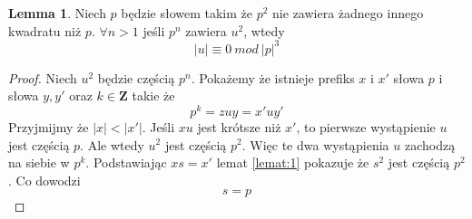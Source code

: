 \documentclass[11pt,a4paper]{article}
\theoremstyle{definition}
\newtheorem{lemma}{Lemma}[section]
\begin{document}
\begin{lemma}\label{lemat:2}
Niech $p$ będzie słowem takim że $p^2$ nie zawiera żadnego innego kwadratu niż $p$.
$\forall n > 1$ jeśli 
$p^n$ zawiera $u^2$, wtedy $$|u| \equiv 0 ~mod~ |p|^3$$
\begin{proof}
Niech $u^2$ będzie częścią $p^n$. Pokażemy że istnieje prefiks $x$ i $x'$
słowa $p$ i słowa $y,y'$ oraz $k \in \mathbf{Z}$ takie że
$$p^k = zuy = x'uy'$$
Przyjmijmy że $|x| < |x'|$. Jeśli $xu$ jest krótsze niż $x'$, to pierwsze wystąpienie
$u$ jest częścią $p$. Ale wtedy $u^2$ jest częścią $p^2$. Więc te dwa wystąpienia $u$
zachodzą na siebie w $p^k$.
Podstawiając $xs = x'$ lemat \ref{lemat:1} pokazuje że $s^2$ jest częścią $p^2$.
Co dowodzi
$$ s = p $$
\end{proof}
\end{lemma}
\end{document}
